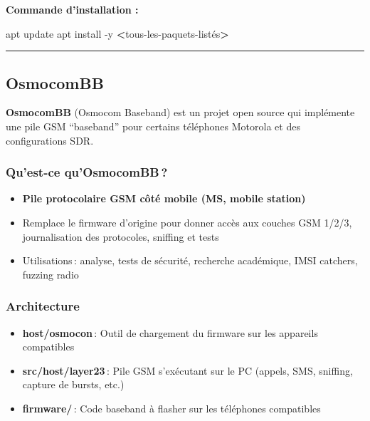 \documentclass[
  french,
]{article}
\newenvironment{Shaded}{\begin{snugshade}}{\end{snugshade}}
\newcommand{\AttributeTok}[1]{\textcolor[rgb]{0.13,0.29,0.53}{#1}}
\newcommand{\ExtensionTok}[1]{#1}
\newcommand{\NormalTok}[1]{#1}
\newcommand{\OperatorTok}[1]{\textcolor[rgb]{0.81,0.36,0.00}{\textbf{#1}}}
\providecommand{\tightlist}{%
  \setlength{\itemsep}{0pt}\setlength{\parskip}{0pt}}
\begin{document}
\textbf{Commande d'installation :}

\begin{Shaded}
\begin{Highlighting}[]
\ExtensionTok{apt}\NormalTok{ update}
\ExtensionTok{apt}\NormalTok{ install }\AttributeTok{{-}y} \OperatorTok{\textless{}}\NormalTok{tous{-}les{-}paquets{-}listés}\OperatorTok{\textgreater{}}
\end{Highlighting}
\end{Shaded}

\begin{center}\rule{0.5\linewidth}{0.5pt}\end{center}

\subsection{OsmocomBB}\label{osmocombb}

\textbf{OsmocomBB} (Osmocom Baseband) est un projet open source qui
implémente une pile GSM ``baseband'' pour certains téléphones Motorola
et des configurations SDR.

\subsubsection{Qu'est-ce qu'OsmocomBB\,?}\label{quest-ce-quosmocombb}

\begin{itemize}
\tightlist
\item
  \textbf{Pile protocolaire GSM côté mobile (MS, mobile station)}
\item
  Remplace le firmware d'origine pour donner accès aux couches GSM
  1/2/3, journalisation des protocoles, sniffing et tests
\item
  Utilisations\,: analyse, tests de sécurité, recherche académique, IMSI
  catchers, fuzzing radio
\end{itemize}

\subsubsection{Architecture}\label{architecture}

\begin{itemize}
\tightlist
\item
  \textbf{host/osmocon}\,: Outil de chargement du firmware sur les
  appareils compatibles
\item
  \textbf{src/host/layer23}\,: Pile GSM s'exécutant sur le PC (appels,
  SMS, sniffing, capture de bursts, etc.)
\item
  \textbf{firmware/}\,: Code baseband à flasher sur les téléphones
  compatibles
\end{itemize}
\end{document}
